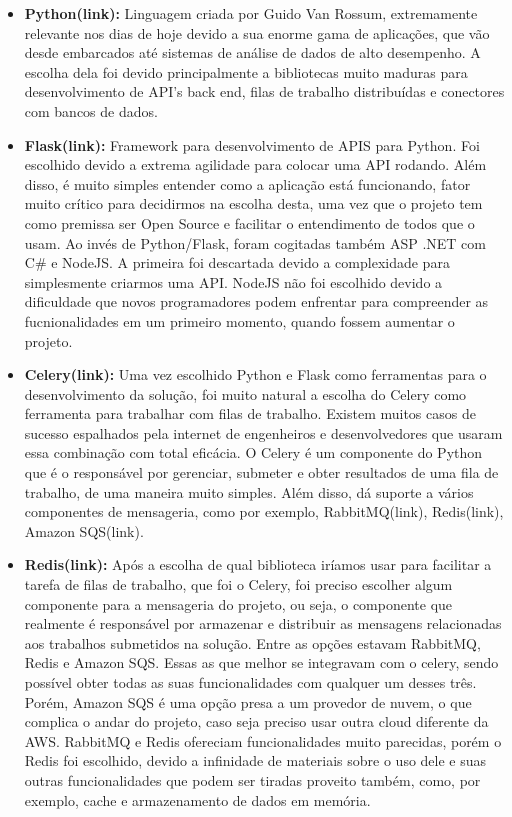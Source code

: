 \documentclass[11pt,twoside]{article}
\begin{document}
\begin{itemize}
  \item \textbf{Python(link):} Linguagem criada por Guido Van Rossum, extremamente relevante nos dias de hoje devido a sua enorme gama de aplicações, que vão desde embarcados até sistemas de análise de dados de alto 
  desempenho. A escolha dela foi devido principalmente a bibliotecas muito maduras para desenvolvimento de API's back end, filas de trabalho distribuídas e conectores com bancos de dados.

  \item \textbf{Flask(link):} Framework para desenvolvimento de APIS para Python. Foi escolhido devido a extrema agilidade para colocar uma API rodando. Além disso, é muito simples entender como a aplicação está funcionando,
  fator muito crítico para decidirmos na escolha desta, uma vez que o projeto tem como premissa ser Open Source e facilitar o entendimento de todos que o usam. Ao invés de Python/Flask, foram cogitadas também ASP .NET
  com C\# e NodeJS. A primeira foi descartada devido a complexidade para simplesmente criarmos uma API. NodeJS não foi escolhido devido a dificuldade que novos programadores podem enfrentar para compreender as
  fucnionalidades em um primeiro momento, quando fossem aumentar o projeto.

  \item \textbf{Celery(link):} Uma vez escolhido Python e Flask como ferramentas para o desenvolvimento da solução, foi muito natural a escolha do Celery como ferramenta para trabalhar com filas de trabalho. Existem muitos
  casos de sucesso espalhados pela internet de engenheiros e desenvolvedores que usaram essa combinação com total eficácia. O Celery é um componente do Python que é o responsável por gerenciar, submeter e obter
  resultados de uma fila de trabalho, de uma maneira muito simples. Além disso, dá suporte a vários componentes de mensageria, como por exemplo, RabbitMQ(link), Redis(link), Amazon SQS(link).

  \item \textbf{Redis(link):} Após a escolha de qual biblioteca iríamos usar para facilitar a tarefa de filas de trabalho, que foi o Celery, foi preciso escolher algum componente para a mensageria do projeto, ou seja, o
  componente que realmente é responsável por armazenar e distribuir as mensagens relacionadas aos trabalhos submetidos na solução. Entre as opções estavam RabbitMQ, Redis e Amazon SQS. Essas as que melhor se 
  integravam com o celery, sendo possível obter todas as suas funcionalidades com qualquer um desses três. Porém, Amazon SQS é uma opção presa a um provedor de nuvem, o que complica o andar do projeto, caso seja 
  preciso usar outra cloud diferente da AWS. RabbitMQ e Redis ofereciam funcionalidades muito parecidas, porém o Redis foi escolhido, devido a infinidade de materiais sobre o uso dele e suas outras funcionalidades
  que podem ser tiradas proveito também, como, por exemplo, cache e armazenamento de dados em memória.


\end{itemize}
\end{document}
